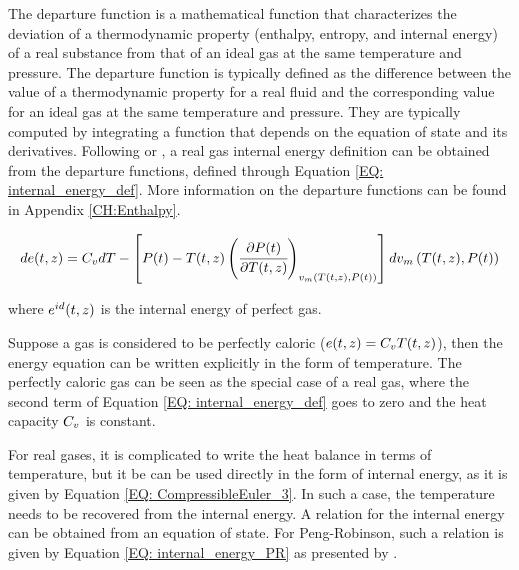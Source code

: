 \documentclass[../Article_Sensitivity_Analsysis.tex]{subfiles}
\begin{document}
			The departure function is a mathematical function that characterizes the deviation of a thermodynamic property (enthalpy, entropy, and internal energy) of a real substance from that of an ideal gas at the same temperature and pressure. The departure function is typically defined as the difference between the value of a thermodynamic property for a real fluid and the corresponding value for an ideal gas at the same temperature and pressure. They are typically computed by integrating a function that depends on the equation of state and its derivatives. Following \citet{Elliott2011} or \citet{Gmehling2019}, a real gas internal energy definition can be obtained from the departure functions, defined through Equation \ref{EQ: internal_energy_def}. More information on the departure functions can be found in Appendix \ref{CH:Enthalpy}.

			{\footnotesize
				\begin{equation}
					d{\color{black}e}(t,z)=C_vd{\color{black}T}-\left[{\color{black}P}(t)-{\color{black}T}(t,z)\left(\cfrac{\partial {\color{black}P}(t)}{\partial {\color{black}T}(t,z)}\right)_{{\color{black}v_m}\left({\color{black}T}(t,z), {\color{black}P}(t)\right)}\right]d{\color{black}v_m}\left({\color{black}T}(t,z), {\color{black}P}(t)\right)
					\label{EQ: internal_energy_def}
				\end{equation} }
			
			where ${\color{black}e}^{id}(t,z)$ is the internal energy of perfect gas.
			
			Suppose a gas is considered to be perfectly caloric (${\color{black}e}(t,z)={\color{black}C_v} {\color{black}T}(t,z)$), then the energy equation can be written explicitly in the form of temperature. The perfectly caloric gas can be seen as the special case of a real gas, where the second term of Equation \ref{EQ: internal_energy_def} goes to zero and the heat capacity ${\color{black}C_v}$ is constant.
			
			For real gases, it is complicated to write the heat balance in terms of temperature, but it be can be used directly in the form of internal energy, as it is given by Equation \ref{EQ: CompressibleEuler_3}. In such a case, the temperature needs to be recovered from the internal energy. A relation for the internal energy can be obtained from an equation of state. For Peng-Robinson, such a relation is given by Equation \ref{EQ: internal_energy_PR} as presented by \citet{Elliott2011}.
			
		
\end{document}

